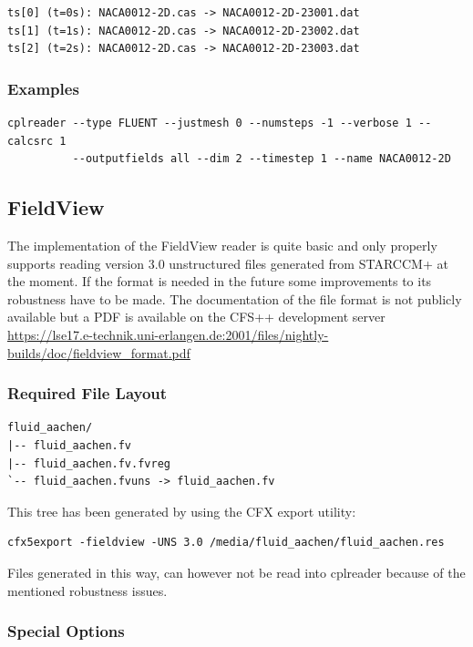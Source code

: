 \documentclass[a4paper,10pt]{article}
\begin{document}
\begin{verbatim}
ts[0] (t=0s): NACA0012-2D.cas -> NACA0012-2D-23001.dat
ts[1] (t=1s): NACA0012-2D.cas -> NACA0012-2D-23002.dat
ts[2] (t=2s): NACA0012-2D.cas -> NACA0012-2D-23003.dat
\end{verbatim}

\subsubsection{Examples}

\begin{verbatim}
cplreader --type FLUENT --justmesh 0 --numsteps -1 --verbose 1 --calcsrc 1 
          --outputfields all --dim 2 --timestep 1 --name NACA0012-2D
\end{verbatim}

\newpage
\subsection{FieldView}
\label{sec:fieldview}

The implementation  of the FieldView reader  is quite basic  and only properly
supports reading version 3.0 unstructured files generated from STARCCM+ at the
moment.   If the  format is  needed  in the  future some  improvements to  its
robustness  have to  be made.  The  documentation of  the file  format is  not
publicly  available but a  PDF is  available on  the CFS++  development server
\url{https://lse17.e-technik.uni-erlangen.de:2001/files/nightly-builds/doc/fieldview_format.pdf}

\subsubsection{Required File Layout}
\begin{verbatim}
fluid_aachen/
|-- fluid_aachen.fv
|-- fluid_aachen.fv.fvreg
`-- fluid_aachen.fvuns -> fluid_aachen.fv
\end{verbatim}

This tree has been generated by using the CFX export utility:
\begin{verbatim}
cfx5export -fieldview -UNS 3.0 /media/fluid_aachen/fluid_aachen.res
\end{verbatim}

Files generated in this way, can however not be read into cplreader because of
the mentioned robustness issues.

\subsubsection{Special Options}
\end{document}
